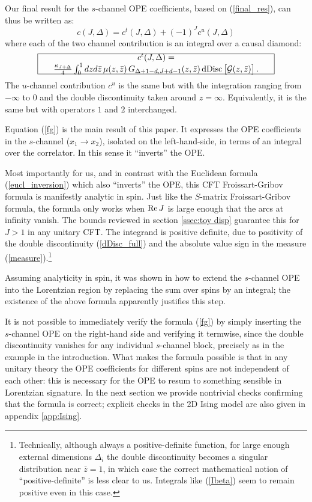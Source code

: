 \documentclass[11pt, reqno,preprint]{article}
\def\be{\begin{equation}}
\def\ee{\end{equation}}
\def\dDisc{{\rm dDisc}\,}
\def\zbar{\bar{z}}
\def\j{J}
\def\c{c}
\def\GG{\mathcal{G}}
\begin{document}
Our final result for the $s$-channel OPE coefficients, based on (\ref{final_res}), can thus be written as:
\be
 \c(\j,\Delta) = \c^t(\j,\Delta) + (-1)^{\j} \c^u(\j,\Delta) \label{fg_tu}
\ee
where each of the two channel contribution is an integral over a causal diamond:
\be
\framebox{\begin{minipage}[c][4ex][c]{.8\textwidth}\centering
$\c^t(\j,\Delta) =
\frac{\kappa_{\j+\Delta}}{4}\int_{0}^1 dz d\zbar\, \mu(z,\zbar)\, G_{\Delta+1-d,\j+d-1}(z,\zbar)\,\dDisc\big[\GG(z,\zbar)\big]\,.$
 \end{minipage}} \label{fg}
\ee
The $u$-channel contribution $\c^u$ is the same but with the integration ranging from $-\infty$ to 0
and the double discontinuity taken around $z=\infty$. Equivalently, it is the same but
with operators $1$ and $2$ interchanged.

Equation (\ref{fg}) is the main result of this paper.
It expresses the OPE coefficients in the $s$-channel ($x_1\to x_2$), isolated on the left-hand-side, in terms
of an integral over the correlator. In this sense it ``inverts'' the OPE.

Most importantly for us, and in contrast with the Euclidean formula (\ref{eucl_inversion}) which also ``inverts'' the OPE,
this CFT Froissart-Gribov formula is manifestly analytic in spin.
Just like the $S$-matrix Froissart-Gribov formula, the formula only works when ${\rm Re}\,\j$ is large enough
that the arcs at infinity vanish.  The bounds reviewed in section \ref{ssec:toy disp}
guarantee this for $\j>1$ in any unitary CFT.
The integrand is positive definite, due to positivity of the double discontinuity (\ref{dDisc_full}) and the absolute value sign in the measure (\ref{measure}).\footnote{
Technically, although always a positive-definite function,
for large enough external dimensions $\Delta_i$ the double discontinuity becomes a singular distribution near $\zbar=1$,
in which case the correct mathematical notion of ``positive-definite'' is less clear to us.
Integrals like (\ref{Ibeta}) seem to remain positive even in this case.}

Assuming analyticity in spin, it was shown in \cite{Costa:2012cb} how to extend the $s$-channel OPE
into the Lorentzian region by replacing the sum over spins by an integral;
the existence of the above formula apparently justifies this step.

It is not possible to immediately verify the formula (\ref{fg}) by simply inserting the $s$-channel OPE on the right-hand side
and verifying it termwise, since the double discontinuity vanishes for any individual $s$-channel block,
precisely as in the example in the introduction.
What makes the formula possible is that in any unitary theory the OPE coefficients for different spins are not independent of each other:
this is necessary for the OPE to resum to something sensible in Lorentzian signature.
In the next section we provide nontrivial checks confirming that the formula is correct;
explicit checks in the 2D Ising model are also given in appendix \ref{app:Ising}.
\end{document}
